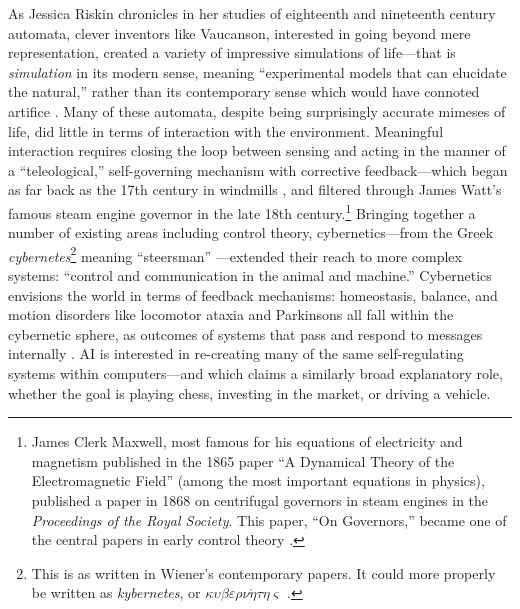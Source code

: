 As Jessica Riskin chronicles in her studies of eighteenth and
nineteenth century automata, clever inventors like Vaucanson, interested in going
beyond mere representation, created a variety of impressive
simulations of life---that is \emph{simulation} in its modern sense, meaning
``experimental models that can elucidate the natural,'' rather than its
contemporary sense which would have connoted artifice \cite[p.
  605--606]{riskinDuck}. Many of these automata, despite being surprisingly accurate
mimeses of life, did little in terms of interaction with the
environment. Meaningful interaction requires closing the loop between
sensing and acting in the manner of a
 ``teleological,'' self-governing mechanism with corrective
feedback---which began as far back as the 17th century in windmills \cite{richardhills},
and filtered through James Watt's famous steam engine governor in the
late 18th century.\footnote{James Clerk Maxwell, most famous for his equations of
 electricity and magnetism published in the 1865 paper ``A Dynamical
 Theory of the Electromagnetic Field'' (among the most important
 equations in physics), published a paper in 1868 on centrifugal
 governors in steam engines in the \emph{Proceedings of the Royal Society}. This
 paper, ``On Governors,'' became one of the central papers in early
 control theory \cite{ottomayr}.} Bringing together a number of existing
 areas including control theory,
 cybernetics---from the Greek \emph{cybernetes}\footnote{This is as
   written in Wiener's contemporary papers. It could more properly be written
   as \emph{kybernetes}, or 
   $\kappa\upsilon\beta\varepsilon\rho\nu\acute{\eta}\tau\eta\varsigma$
   \cite[p. 11]{cybernetics}.} meaning 
 ``steersman'' \cite[p. 6]{wienerMainIdeas}---extended their reach to more complex
 systems: ``control and communication in the animal and machine.''
 Cybernetics envisions the world in 
 terms of feedback mechanisms: homeostasis, balance, and motion
 disorders like locomotor ataxia and Parkinsons all fall within the
 cybernetic sphere, as outcomes of systems that pass and respond to
 messages internally \cite[p. 10-15]{wienerMainIdeas}. 
 AI is interested in re-creating many of the same
 self-regulating systems within computers---and which claims a
 similarly broad explanatory role, whether the goal is playing chess,
 investing in the market, or driving a vehicle. 


